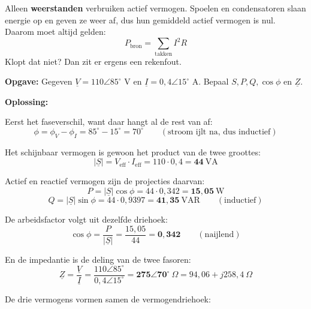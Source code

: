 \documentclass[a4paper,11pt]{article}
\begin{document}
\begin{examenbox}
    Alleen \textbf{weerstanden} verbruiken actief vermogen. Spoelen en condensatoren slaan
    energie op en geven ze weer af, dus hun gemiddeld actief vermogen is nul. Daarom moet altijd
    gelden:
    \[P_{\text{bron}} = \sum_{\text{takken}} I^2 R\]
    Klopt dat niet? Dan zit er ergens een rekenfout.
\end{examenbox}

\begin{oefening}
    \textbf{Opgave:} Gegeven $\underline{V} = 110\angle 85^\circ\text{ V}$ en $\underline{I} = 0{,}4\angle 15^\circ\text{ A}$. Bepaal $S, P, Q, \cos\phi$ en $\underline{Z}$.

    \textbf{Oplossing:}

    Eerst het faseverschil, want daar hangt al de rest van af:
    \[\phi = \phi_V - \phi_I = 85^\circ - 15^\circ = 70^\circ \qquad (\text{stroom ijlt na, dus inductief})\]

    Het schijnbaar vermogen is gewoon het product van de twee groottes:
    \[|\underline{S}| = V_{\text{eff}} \cdot I_{\text{eff}} = 110 \cdot 0{,}4 = \mathbf{44}\ \text{VA}\]

    Actief en reactief vermogen zijn de projecties daarvan:
    \[P = |\underline{S}| \cos\phi = 44 \cdot 0{,}342 = \mathbf{15{,}05}\ \text{W}\]
    \[Q = |\underline{S}| \sin\phi = 44 \cdot 0{,}9397 = \mathbf{41{,}35}\ \text{VAR} \qquad (\text{inductief})\]

    De arbeidsfactor volgt uit dezelfde driehoek:
    \[\cos\phi = \frac{P}{|\underline{S}|} = \frac{15{,}05}{44} = \mathbf{0{,}342} \qquad (\text{naijlend})\]

    En de impedantie is de deling van de twee fasoren:
    \[\underline{Z} = \frac{\underline{V}}{\underline{I}}
        = \frac{110\angle 85^\circ}{0{,}4\angle 15^\circ}
        = \mathbf{275\angle 70^\circ}\ \Omega
        = 94{,}06 + j258{,}4\ \Omega\]

    De drie vermogens vormen samen de vermogendriehoek:
    \begin{center}
    \end{center}
\end{oefening}
\end{document}
